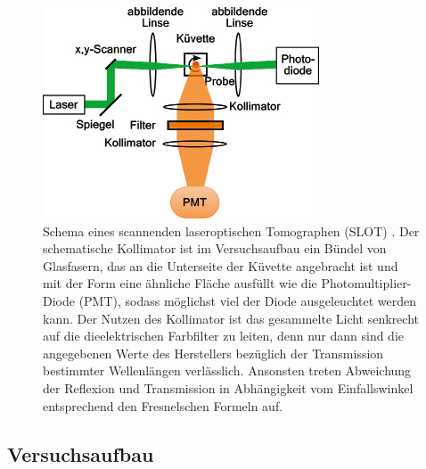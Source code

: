 \begin{figure}
	\centering
\includegraphics[width=0.8\linewidth]{IMAGE/slot_schema.png}
	\caption{Schema eines scannenden laseroptischen Tomographen (SLOT) \cite{slot_paper}. 
	Der schematische Kollimator ist im Versuchsaufbau ein Bündel von Glasfasern, das an die Unterseite der Küvette angebracht ist und mit der Form eine ähnliche Fläche ausfüllt wie die Photomultiplier-Diode (PMT), sodass möglichst viel der Diode ausgeleuchtet werden kann.
	Der Nutzen des Kollimator ist das gesammelte Licht senkrecht auf die dieelektrischen Farbfilter zu leiten, denn nur dann sind die angegebenen Werte des Herstellers bezüglich der Transmission bestimmter Wellenlängen verlässlich. Ansonsten treten Abweichung der Reflexion und Transmission in Abhängigkeit vom Einfallswinkel entsprechend den Fresnelschen Formeln auf.}
	\label{fig:schema}
\end{figure} 


\subsection{Versuchsaufbau}


